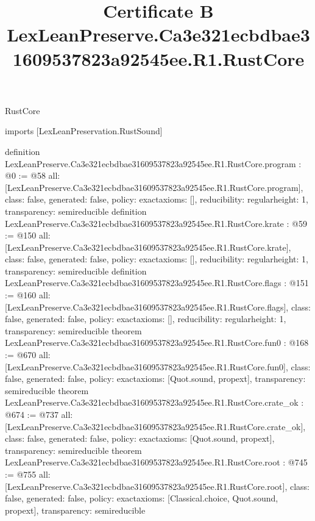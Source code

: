 \begin{lexlean}{RustCore}
\title{Certificate B LexLeanPreserve.Ca3e321ecbdbae31609537823a92545ee.R1.RustCore}
\begin{coremodule}
imports [LexLeanPreservation.RustSound]

definition LexLeanPreserve.Ca3e321ecbdbae31609537823a92545ee.R1.RustCore.program : @0 := @58 {
  all: [LexLeanPreserve.Ca3e321ecbdbae31609537823a92545ee.R1.RustCore.program],
  class: false,
  generated: false,
  policy: exact{axioms: []},
  reducibility: regular{height: 1},
  transparency: semireducible
}
definition LexLeanPreserve.Ca3e321ecbdbae31609537823a92545ee.R1.RustCore.krate : @59 := @150 {
  all: [LexLeanPreserve.Ca3e321ecbdbae31609537823a92545ee.R1.RustCore.krate],
  class: false,
  generated: false,
  policy: exact{axioms: []},
  reducibility: regular{height: 1},
  transparency: semireducible
}
definition LexLeanPreserve.Ca3e321ecbdbae31609537823a92545ee.R1.RustCore.flags : @151 := @160 {
  all: [LexLeanPreserve.Ca3e321ecbdbae31609537823a92545ee.R1.RustCore.flags],
  class: false,
  generated: false,
  policy: exact{axioms: []},
  reducibility: regular{height: 1},
  transparency: semireducible
}
theorem LexLeanPreserve.Ca3e321ecbdbae31609537823a92545ee.R1.RustCore.fun0 : @168 := @670 {
  all: [LexLeanPreserve.Ca3e321ecbdbae31609537823a92545ee.R1.RustCore.fun0],
  class: false,
  generated: false,
  policy: exact{axioms: [Quot.sound, propext]},
  transparency: semireducible
}
theorem LexLeanPreserve.Ca3e321ecbdbae31609537823a92545ee.R1.RustCore.crate_ok : @674 := @737 {
  all: [LexLeanPreserve.Ca3e321ecbdbae31609537823a92545ee.R1.RustCore.crate_ok],
  class: false,
  generated: false,
  policy: exact{axioms: [Quot.sound, propext]},
  transparency: semireducible
}
theorem LexLeanPreserve.Ca3e321ecbdbae31609537823a92545ee.R1.RustCore.root : @745 := @755 {
  all: [LexLeanPreserve.Ca3e321ecbdbae31609537823a92545ee.R1.RustCore.root],
  class: false,
  generated: false,
  policy: exact{axioms: [Classical.choice, Quot.sound, propext]},
  transparency: semireducible
}


\end{coremodule}
\end{lexlean}
